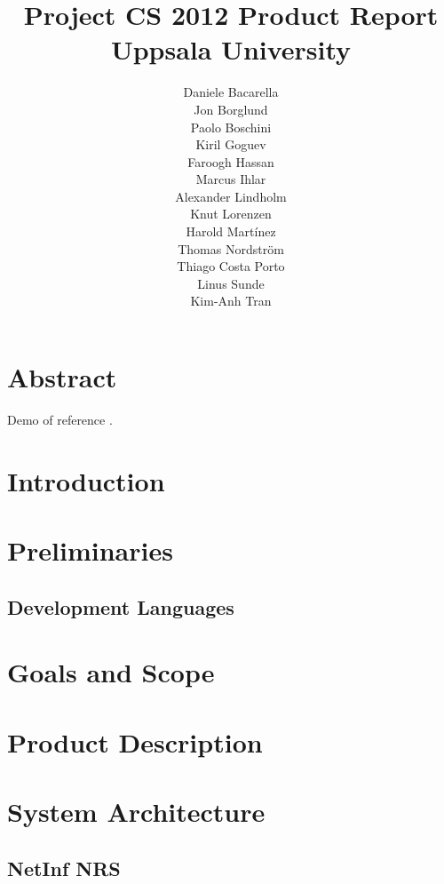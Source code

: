 \documentclass[11pt]{report}
\title{Project CS 2012 Product Report\\Uppsala University\\}
\author{Daniele Bacarella\\
		Jon Borglund\\
		Paolo Boschini\\
		Kiril Goguev\\
		Faroogh Hassan\\
		Marcus Ihlar\\
		Alexander Lindholm\\
		Knut Lorenzen\\
		Harold Mart\'{i}nez\\
		Thomas Nordstr\"om\\
		Thiago Costa Porto\\
		Linus Sunde\\
		Kim-Anh Tran
}
\date{}
\begin{document}
\maketitle

\tableofcontents

\chapter{Abstract}

Demo of reference \cite{b1}. 
\chapter{Introduction}


\chapter{Preliminaries}

\section{Development Languages}


\chapter{Goals and Scope}


\chapter{Product Description}





\chapter{System Architecture}



\section {NetInf NRS}


\end{document}
